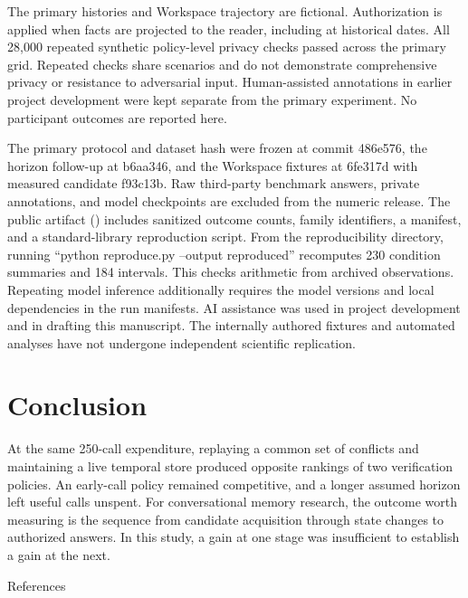 \documentclass[
  11pt,
]{article}
\begin{document}
The primary histories and Workspace trajectory are fictional.
Authorization is applied when facts are projected to the reader,
including at historical dates. All 28,000 repeated synthetic
policy-level privacy checks passed across the primary grid. Repeated
checks share scenarios and do not demonstrate comprehensive privacy or
resistance to adversarial input. Human-assisted annotations in earlier
project development were kept separate from the primary experiment. No
participant outcomes are reported here.

The primary protocol and dataset hash were frozen at commit 486e576, the
horizon follow-up at b6aa346, and the Workspace fixtures at 6fe317d with
measured candidate f93c13b. Raw third-party benchmark answers, private
annotations, and model checkpoints are excluded from the numeric
release. The public artifact () includes sanitized outcome counts, family identifiers, a
manifest, and a standard-library reproduction script. From the
reproducibility directory, running ``python reproduce.py --output
reproduced'' recomputes 230 condition summaries and 184 intervals. This
checks arithmetic from archived observations. Repeating model inference
additionally requires the model versions and local dependencies in the
run manifests. AI assistance was used in project development and in
drafting this manuscript. The internally authored fixtures and automated
analyses have not undergone independent scientific replication.

\section{Conclusion}\label{conclusion}

At the same 250-call expenditure, replaying a common set of conflicts
and maintaining a live temporal store produced opposite rankings of two
verification policies. An early-call policy remained competitive, and a
longer assumed horizon left useful calls unspent. For conversational
memory research, the outcome worth measuring is the sequence from
candidate acquisition through state changes to authorized answers. In
this study, a gain at one stage was insufficient to establish a gain at
the next.

References
\end{document}
